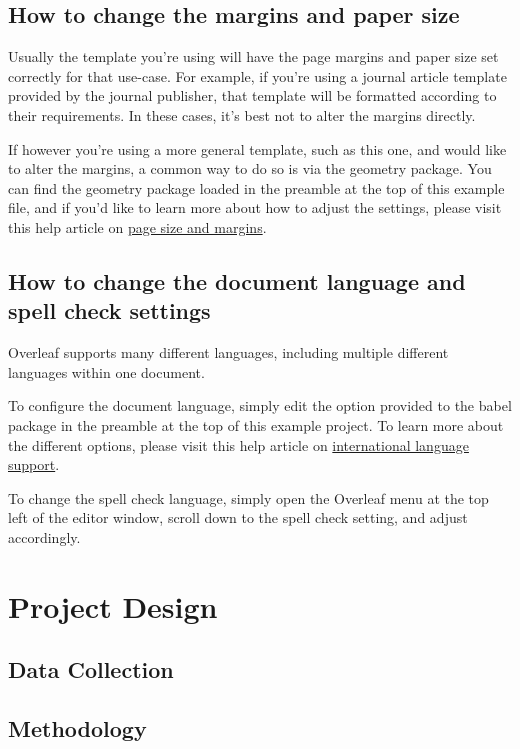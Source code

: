 \documentclass{article}
\begin{document}
\subsection{How to change the margins and paper size}

Usually the template you're using will have the page margins and paper size set correctly for that use-case. For example, if you're using a journal article template provided by the journal publisher, that template will be formatted according to their requirements. In these cases, it's best not to alter the margins directly.

If however you're using a more general template, such as this one, and would like to alter the margins, a common way to do so is via the geometry package. You can find the geometry package loaded in the preamble at the top of this example file, and if you'd like to learn more about how to adjust the settings, please visit this help article on \href{https://www.overleaf.com/learn/latex/page_size_and_margins}{page size and margins}.

\subsection{How to change the document language and spell check settings}

Overleaf supports many different languages, including multiple different languages within one document. 

To configure the document language, simply edit the option provided to the babel package in the preamble at the top of this example project. To learn more about the different options, please visit this help article on \href{https://www.overleaf.com/learn/latex/International_language_support}{international language support}.

To change the spell check language, simply open the Overleaf menu at the top left of the editor window, scroll down to the spell check setting, and adjust accordingly.


\section {Project Design}

\subsection{Data Collection}

\subsection{Methodology}
\end{document}
